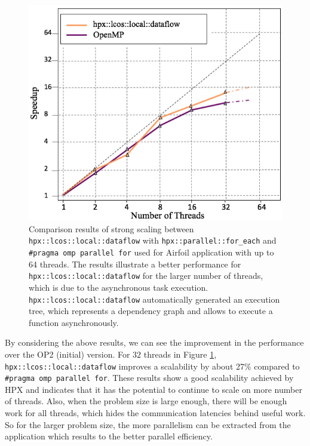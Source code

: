 \documentclass[conference]{IEEEtran}
\begin{document}
\begin{figure} 
\begin{center}
\centering
\includegraphics[width=1\columnwidth]{Pictures/dataflow.jpg}
\caption {\small{Comparison results of strong scaling between \texttt{hpx::lcos::local::dataflow} with \texttt{hpx::parallel::for\_each} and \texttt{\#pragma omp parallel for} used for Airfoil application
with up to 64 threads. The results illustrate a better performance for \texttt{hpx::lcos::local::dataflow} for the larger number of threads, which is due to the asynchronous task execution. \texttt{hpx::lcos::local::dataflow} automatically generated an execution tree, which represents a dependency graph and allows to execute a function asynchronously. }}
\label{f2}
\end{center}
\end{figure}

By considering the above results, we can see the improvement in the performance over the OP2 (initial) version. For $32$ threads in Figure \ref{f2}, \texttt{hpx::lcos::local::dataflow} improves a scalability by about 27\% compared to \texttt{\#pragma omp parallel for}. These results show a good scalability achieved by HPX and indicates that it has the potential to continue to scale on more number of threads. Also, when the problem size is large enough, there will be enough work for all threads, which hides the communication latencies behind useful work. So for the larger problem size, the more parallelism can be extracted from the application which results to the better parallel efficiency. 
\end{document}
